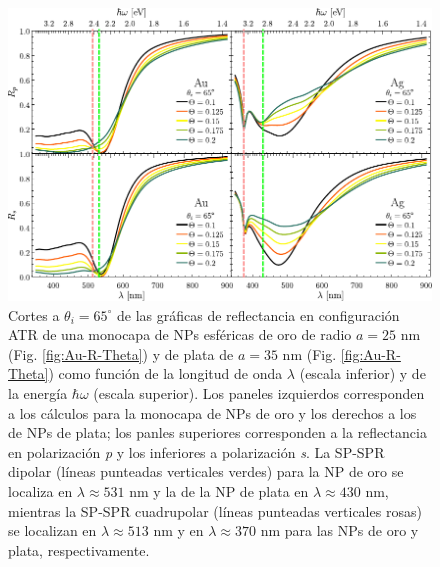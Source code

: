 \begin{figure}[h!]\centering
	\includegraphics[scale=1]{2-Resultados/figs/6-AuThetaVar/0-cut65_Au_Aug.pdf}\vspace*{-.5em}
	\caption{Cortes a $\theta_i = 65^\circ$ de las gráficas de reflectancia  en configuración ATR  de una monocapa de NPs esféricas de oro de radio $a=25$ nm (Fig. \ref{fig:Au-R-Theta}) y de plata de $a=35$ nm (Fig. \ref{fig:Au-R-Theta}) como función de la longitud de onda $\lambda$ (escala inferior) y de la energía $\hbar\omega$ (escala superior). Los paneles izquierdos corresponden a los cálculos para la monocapa de NPs de oro y los derechos a los de NPs de plata; los panles superiores corresponden a la reflectancia en polarización \emph{p} y los inferiores a polarización \emph{s}. La SP-SPR dipolar (líneas punteadas verticales verdes) para la NP de oro se localiza en  $\lambda \approx 531$ nm y la de la NP de plata en $\lambda\approx430$ nm, mientras la SP-SPR cuadrupolar (líneas punteadas verticales rosas) se localizan en $\lambda\approx513$ nm y en $\lambda\approx370$ nm para las NPs de oro y plata, respectivamente. }\label{fig:AuAg-Cuts-65}
	\end{figure}	
	
